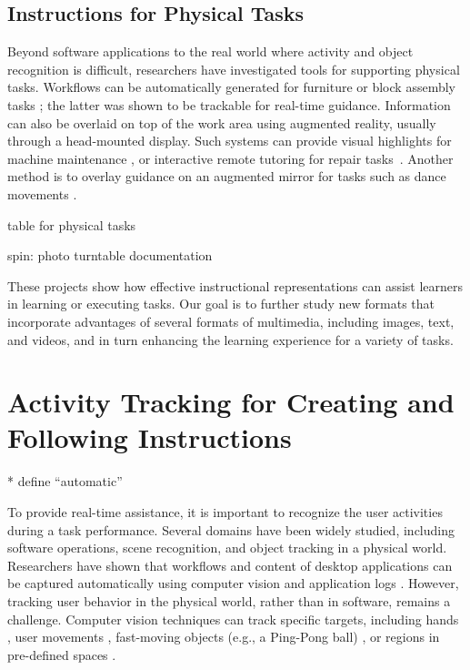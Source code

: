 \subsection{Instructions for Physical Tasks}

Beyond software applications to the real world where activity and object recognition is difficult, researchers have investigated tools for supporting physical tasks. Workflows can be automatically generated for furniture \cite{agrawala2003designing} or block assembly tasks \cite{Gupta:2012ku}; the latter was shown to be trackable for real-time guidance.
%
Information can also be overlaid on top of the work area using augmented reality, usually through a head-mounted display. Such systems can provide visual highlights for machine maintenance \cite{Henderson:2011ff}, or interactive remote tutoring for repair tasks~\cite{Gurevich:2012ko}. Another method is to overlay guidance on an augmented mirror for tasks such as dance movements \cite{Anderson:2013:YEM:2501988.2502045}.

table for physical tasks \cite{Knibbe:2015:SMI:2817721.2817741}

spin: photo turntable \cite{Tseng:2015:SPT:2771839.2771869}
documentation \cite{Tseng:2016:makeology}

These projects show how effective instructional representations can assist learners in learning or executing tasks. Our goal is to further study new formats that incorporate advantages of several formats of multimedia, including images, text, and videos, and in turn enhancing the learning experience for a variety of tasks.



\section{Activity Tracking for Creating and Following Instructions}
\label{background_recognition}

* define ``automatic''

To provide real-time assistance, it is important to recognize the user activities during a task performance. Several domains have been widely studied, including software operations, scene recognition, and object tracking in a physical world.
%
Researchers have shown that workflows and content of desktop applications can be captured automatically using computer vision \cite{Yeh:2009dh,Chang:2011vd} and application logs \cite{Grossman:2010jz,Grabler:2009jj,Pongnumkul:2011ju}.
%
However, tracking user behavior in the physical world, rather than in software, remains a challenge. Computer vision techniques can track specific targets, including hands \cite{Ranjan:2008}, user movements \cite{Wilson:2012fb}, fast-moving objects (e.g., a Ping-Pong ball) \cite{Okumura:2011tr}, or regions in pre-defined spaces \cite{Ranjan:2007}.

